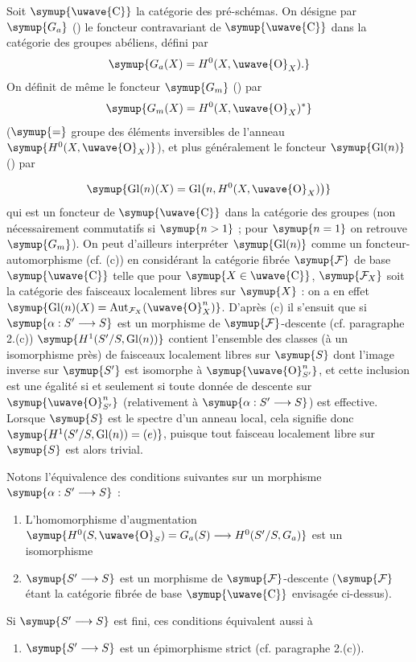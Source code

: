  Soit $\symup{\text{\uwave{C}}}$ la catégorie des pré-schémas. On désigne
par $\symup{G_a}$ () le foncteur contravariant de $\symup{\text{\uwave{C}}}$ dans
la catégorie des groupes abéliens, défini par
\[
  \symup{G_a(X)=H^0(X,\text{\uwave{O}}_X).}
\]
On définit de même le foncteur $\symup{G_m}$ () par
\[
  \symup{G_m(X)=H^0(X,\text{\uwave{O}}_X)^*}
\]
($\symup{=}$ groupe des éléments inversibles de l'anneau $\symup{H^0(X,\text{\uwave{O}}_X)}$), et plus
généralement le foncteur $\symup{\operatorname{Gl}(n)}$ () par

\[
  \symup{\operatorname{Gl}(n)(X)=
  \operatorname{Gl}\bigl(n,H^0(X,\text{\uwave{O}}_X)\bigr)}
\]
qui est un foncteur de $\symup{\text{\uwave{C}}}$ dans la catégorie des groupes (non
nécessairement commutatifs si $\symup{n>1}$ ; pour $\symup{n=1}$ on retrouve $\symup{G_m}$). On peut
d'ailleurs interpréter $\symup{\operatorname{Gl}(n)}$ comme un foncteur-automorphisme
(cf. (c)) en considérant la catégorie fibrée $\symup{\mathcal F}$ de base $\symup{\text{\uwave{C}}}$
telle que pour $\symup{X\in\text{\uwave{C}}}$, $\symup{\mathcal F_X}$ soit la catégorie des
faisceaux localement libres sur $\symup{X}$ : on a en effet $\symup{\operatorname{Gl}(n)(X)=\operatorname{Aut}_{\mathcal F_X}(\text{\uwave{O}}_X^n)}$.
D'après (c) il s'ensuit que si $\symup{\alpha:S'\longrightarrow S}$ est un morphisme
de $\symup{\mathcal F}$-descente (cf. paragraphe 2.(c)) $\symup{H^1(S'/S,\operatorname{Gl}(n))}$
contient l'ensemble des classes (à un isomorphisme près) de faisceaux localement
libres sur $\symup{S}$ dont l'image inverse sur $\symup{S'}$ est isomorphe à
$\symup{\text{\uwave{O}}_{S'}^n}$, et cette inclusion est une égalité si et seulement si
toute donnée de descente sur $\symup{\text{\uwave{O}}_{S'}^n}$ (relativement à
$\symup{\alpha:S'\longrightarrow S}$) est effective. Lorsque $\symup{S}$ est le spectre d'un
anneau local, cela signifie donc
$\symup{H^1(S'/S,\operatorname{Gl}(n))=(e)}$, puisque tout faisceau localement libre
sur $\symup{S}$ est alors trivial.

Notons l'équivalence des conditions suivantes sur un morphisme
$\symup{\alpha:S'\longrightarrow S}$ :
\begin{enumerate}
\item[\textnormal{(i).}] L'homomorphisme d'augmentation $\symup{H^0(S,\text{\uwave{O}}_S)=G_a(S)\longrightarrow H^0(S'/S,G_a)}$ est un isomorphisme
\item[\textnormal{(ii).}] $\symup{S'\longrightarrow S}$ est un morphisme de $\symup{\mathcal F}$-descente
($\symup{\mathcal F}$ étant la catégorie fibrée de base $\symup{\text{\uwave{C}}}$ envisagée
ci-dessus).
\end{enumerate}
Si $\symup{S'\longrightarrow S}$ est fini, ces conditions équivalent aussi à
\begin{enumerate}
\item[\textnormal{(iii).}] $\symup{S'\longrightarrow S}$ est un épimorphisme strict
(cf. paragraphe 2.(c)).
\end{enumerate}

